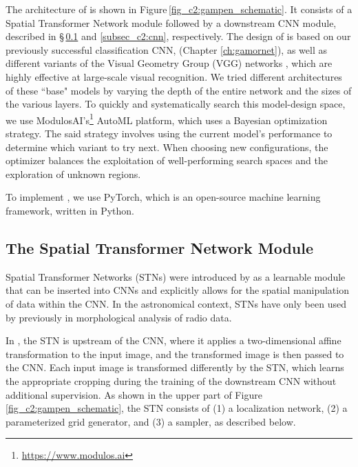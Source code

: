The architecture of \gampen{} is shown in Figure\,\ref{fig_c2:gampen_schematic}. It consists of a Spatial Transformer Network module followed by a downstream CNN module, described in \S\,\ref{subsec_c2:STN} and \ref{subsec_c2:cnn}, respectively. The design of \gampen{} is based on our previously successful classification CNN, \gamornet{} (Chapter \ref{ch:gamornet}), as well as different variants of the Visual Geometry Group (VGG) networks \citep{vgg}, which are highly effective at large-scale visual recognition. We tried different architectures of these ``base" models by varying the depth of the entire network and the sizes of the various layers. To quickly and systematically search this model-design space, we use ModulosAI's\footnote{\href{https://www.modulos.ai}{https://www.modulos.ai}} AutoML platform, which uses a Bayesian optimization strategy. The said strategy involves using the current model's performance to determine which variant to try next. When choosing new configurations, the optimizer balances the exploitation of well-performing search spaces and the exploration of unknown regions.

To implement \gampen{}, we use PyTorch,
 which is an open-source machine learning framework, written in Python.

\subsection{The Spatial Transformer Network Module } \label{subsec_c2:STN}
Spatial Transformer Networks (STNs) were introduced by \cite{jarderberg_15} as a learnable module that can be inserted into CNNs and explicitly allows for the spatial manipulation of data within the CNN. In the astronomical context, STNs have only been used by \cite{wu_2019} previously in morphological analysis of radio data. 

In \gampen{}, the STN is upstream of the CNN, where it applies a two-dimensional affine transformation to the input image, and the transformed image is then passed to the CNN. 
Each input image is transformed differently by the STN, which 
learns the appropriate cropping during the training of the downstream CNN without additional supervision. As shown in the upper part of Figure \ref{fig_c2:gampen_schematic}, the STN consists of (1) a localization network, (2) a parameterized grid generator, and (3) a sampler, as described below.

